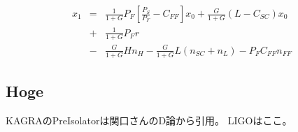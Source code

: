 \documentclass[a4paper,12pt]{jsarticle}
\begin{document}
\begin{eqnarray}
  x_1 &=& \frac{1}{1+G}P_{F}\left[\frac{P_{S}}{P_{F}}-C_{FF}\right]x_0 + \frac{G}{1+G}(L-C_{SC})x_0 \\
  &+& \frac{1}{1+G}P_{F}r \\
  &-& \frac{G}{1+G}Hn_{H} - \frac{G}{1+G}L(n_{SC}+n_{L}) - P_{F}C_{FF}n_{FF}  
\end{eqnarray}



\subsection{Hoge}
KAGRAのPreIsolatorは関口さんのD論から引用。\cite{sekiguchiD2016}
LIGOはここ。


\end{document}
